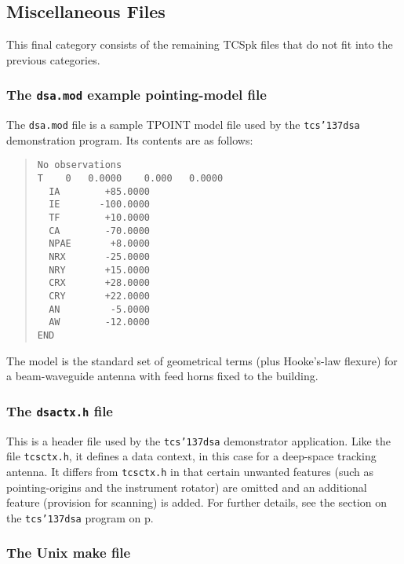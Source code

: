\documentclass[12pt,fleqn,twoside]{article}
\renewcommand{\_}{{\tt\char'137}}     %
\begin{document}

\newpage
\subsection{Miscellaneous Files}
This final category consists of the remaining TCSpk files that do not
fit into the previous categories.

\subsubsection{The {\tt dsa.mod} example pointing-model file}
\label{dsadotmod}

The {\tt dsa.mod} file is a sample TPOINT model file used by the
{\tt tcs\_dsa} demonstration program.  Its contents are as follows:
\begin{quote}
\begin{small}
\begin{verbatim}
No observations
T    0   0.0000    0.000   0.0000
  IA        +85.0000
  IE       -100.0000
  TF        +10.0000
  CA        -70.0000
  NPAE       +8.0000
  NRX       -25.0000
  NRY       +15.0000
  CRX       +28.0000
  CRY       +22.0000
  AN         -5.0000
  AW        -12.0000
END
\end{verbatim}\end{small}
\end{quote}
The model is the standard set of geometrical terms (plus Hooke's-law
flexure) for a beam-waveguide antenna with feed horns fixed to the
building.

\subsubsection{The {\tt dsactx.h} file}
\label{dsactxdoth}

This is a header file used by the {\tt tcs\_dsa} demonstrator
application.  Like the file {\tt tcsctx.h}, it defines a data context,
in this case for a deep-space tracking antenna.  It differs from
{\tt tcsctx.h} in that certain unwanted features (such as pointing-origins
and the instrument rotator) are omitted and an additional feature
(provision for scanning) is added.  For further details, see the
section on the {\tt tcs\_dsa} program on p\pageref{tcs_dsa}.

\subsubsection{The Unix make file}
\label{makefile}
\end{document}
